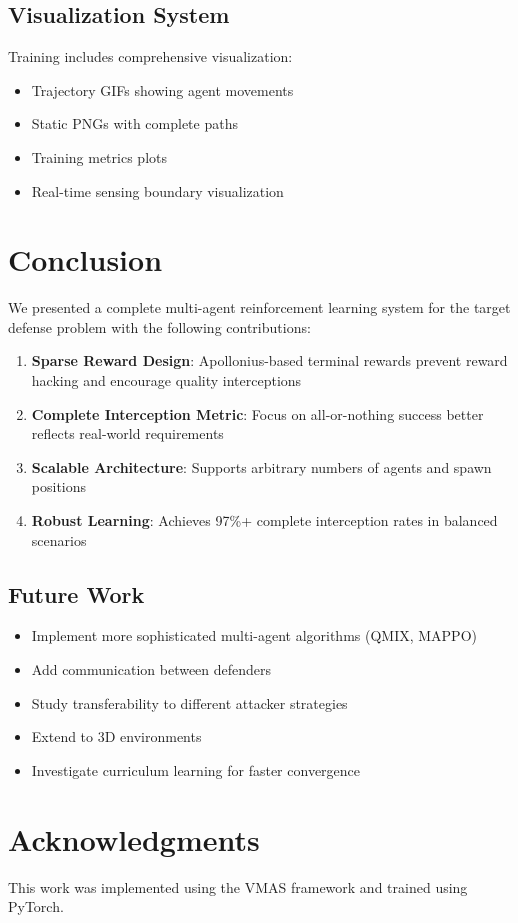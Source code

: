 \documentclass[11pt,a4paper]{article}
\begin{document}
\subsection{Visualization System}

Training includes comprehensive visualization:
\begin{itemize}
    \item Trajectory GIFs showing agent movements
    \item Static PNGs with complete paths
    \item Training metrics plots
    \item Real-time sensing boundary visualization
\end{itemize}

\section{Conclusion}

We presented a complete multi-agent reinforcement learning system for the target defense problem with the following contributions:

\begin{enumerate}
    \item \textbf{Sparse Reward Design}: Apollonius-based terminal rewards prevent reward hacking and encourage quality interceptions
    \item \textbf{Complete Interception Metric}: Focus on all-or-nothing success better reflects real-world requirements
    \item \textbf{Scalable Architecture}: Supports arbitrary numbers of agents and spawn positions
    \item \textbf{Robust Learning}: Achieves 97\%+ complete interception rates in balanced scenarios
\end{enumerate}

\subsection{Future Work}

\begin{itemize}
    \item Implement more sophisticated multi-agent algorithms (QMIX, MAPPO)
    \item Add communication between defenders
    \item Study transferability to different attacker strategies
    \item Extend to 3D environments
    \item Investigate curriculum learning for faster convergence
\end{itemize}

\section*{Acknowledgments}
This work was implemented using the VMAS framework and trained using PyTorch.



\end{document}
